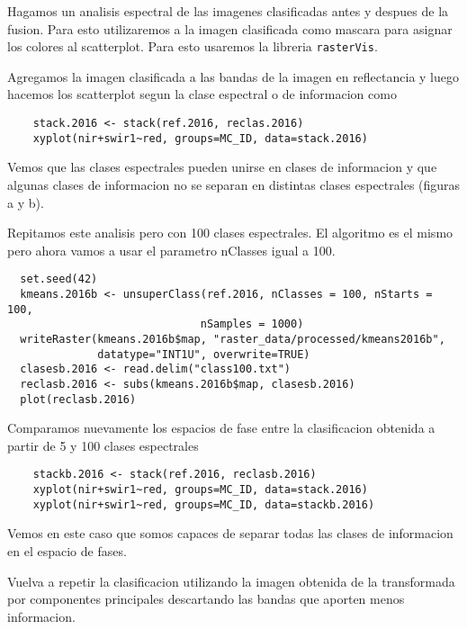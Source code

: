 \begin{exa}
  Hagamos un analisis espectral de las imagenes clasificadas antes y despues de la fusion.
  Para esto utilizaremos a la imagen clasificada como mascara para asignar los colores
  al scatterplot. Para esto usaremos la libreria \texttt{rasterVis}.

  Agregamos la imagen clasificada a las bandas de la imagen en reflectancia y luego
  hacemos los scatterplot segun la clase espectral o de informacion como

  \begin{lstlisting}
    stack.2016 <- stack(ref.2016, reclas.2016)
    xyplot(nir+swir1~red, groups=MC_ID, data=stack.2016)
  \end{lstlisting}

  Vemos que las clases espectrales pueden unirse en clases de informacion y que algunas
  clases de informacion no se separan en distintas clases espectrales (figuras a y b).

\end{exa}

\begin{exa}
  Repitamos este analisis pero con 100 clases espectrales. El algoritmo es el mismo
  pero ahora vamos a usar el parametro nClasses igual a 100.
  \begin{lstlisting}
  set.seed(42)
  kmeans.2016b <- unsuperClass(ref.2016, nClasses = 100, nStarts = 100,
                              nSamples = 1000)
  writeRaster(kmeans.2016b$map, "raster_data/processed/kmeans2016b",
              datatype="INT1U", overwrite=TRUE)
  clasesb.2016 <- read.delim("class100.txt")
  reclasb.2016 <- subs(kmeans.2016b$map, clasesb.2016)
  plot(reclasb.2016)
  \end{lstlisting}
  Comparamos nuevamente los espacios de fase entre la clasificacion obtenida
  a partir de 5 y 100 clases espectrales
  \begin{lstlisting}
    stackb.2016 <- stack(ref.2016, reclasb.2016)
    xyplot(nir+swir1~red, groups=MC_ID, data=stack.2016)
    xyplot(nir+swir1~red, groups=MC_ID, data=stackb.2016)
  \end{lstlisting}

  Vemos en este caso que somos capaces de separar todas las clases de informacion
  en el espacio de fases.

\end{exa}

\begin{act}
    Vuelva a repetir la clasificacion utilizando la imagen obtenida de la
    transformada por componentes principales descartando las bandas que aporten
    menos informacion.
\end{act}

